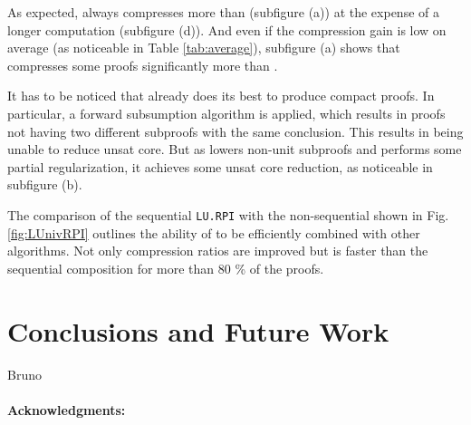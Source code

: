 \documentclass{llncs}
\begin{document}
As expected, {\LowerUnivalents} always compresses more than {\LowerUnits} (subfigure (a)) at the expense of a longer
computation (subfigure (d)). And even if the compression gain is low on average (as noticeable in Table \ref{tab:average}), subfigure (a) shows that {\LowerUnivalents} compresses some proofs significantly more than {\LowerUnits}.

It has to be noticed that \veriT already does its best to produce compact proofs. In particular,
a forward subsumption algorithm is applied, which results in proofs not having two different subproofs
with the same conclusion. This results in {\LowerUnits} being unable to reduce unsat core.
But as {\LowerUnivalents} lowers non-unit subproofs and performs some partial regularization, it
achieves some unsat core reduction, as noticeable in subfigure (b).

The comparison of the sequential \texttt{LU.RPI} with the non-sequential {\LUnivRPI} shown in Fig.
\ref{fig:LUnivRPI} outlines the ability of {\LowerUnivalents} to be efficiently combined with other
algorithms. Not only compression ratios are improved but {\LUnivRPI} is faster than the sequential
composition for more than 80 \% of the proofs.







\section{Conclusions and Future Work}

Bruno


\vspace{-10pt}
\paragraph{Acknowledgments:}





\end{document}
